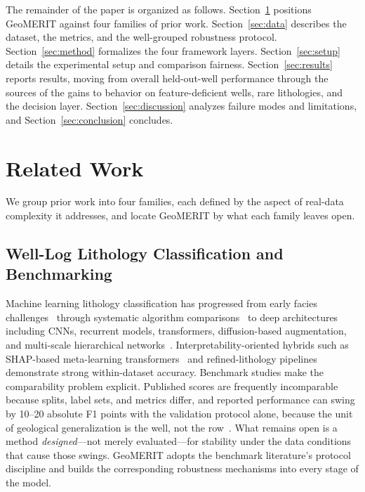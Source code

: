 \documentclass[bdcc,article,submit,pdftex,moreauthors]{Definitions/mdpi}
\begin{document}
The remainder of the paper is organized as follows. Section~\ref{sec:related} positions
GeoMERIT against four families of prior work. Section~\ref{sec:data} describes the dataset,
the metrics, and the well-grouped robustness protocol. Section~\ref{sec:method} formalizes
the four framework layers. Section~\ref{sec:setup} details the experimental setup and
comparison fairness. Section~\ref{sec:results} reports results, moving from overall
held-out-well performance through the sources of the gains to behavior on feature-deficient
wells, rare lithologies, and the decision layer. Section~\ref{sec:discussion} analyzes failure
modes and limitations, and
Section~\ref{sec:conclusion} concludes.

\section{Related Work}
\label{sec:related}
We group prior work into four families, each defined by the aspect of real-data complexity
it addresses, and locate GeoMERIT by what each family leaves open.

\subsection{Well-Log Lithology Classification and Benchmarking}
Machine learning lithology classification has progressed from early facies
challenges~\cite{hall2016facies} through systematic algorithm
comparisons~\cite{merembayev2021,dev2019formation} to deep architectures including CNNs,
recurrent models, transformers, diffusion-based augmentation, and multi-scale hierarchical
networks~\cite{wang2024dnnlitho,chen2025geological,zhao2025diffusion,zhan2025mchgeo}.
Interpretability-oriented hybrids such as SHAP-based meta-learning
transformers~\cite{sun2024shapmeta,lundberg2017shap} and refined-lithology
pipelines~\cite{shi2023refined} demonstrate strong within-dataset accuracy. Benchmark studies
make the comparability problem explicit. Published scores are frequently incomparable because
splits, label sets, and metrics differ, and reported performance can swing by 10--20 absolute
F1 points with the validation protocol alone, because the unit of geological generalization
is the well, not the row~\cite{carvalho2026benchmark,rosenblatt2024}. What remains open is a
method \emph{designed}---not merely evaluated---for stability under the data conditions that
cause those swings. GeoMERIT adopts the benchmark literature's protocol discipline and builds
the corresponding robustness mechanisms into every stage of the model.
\end{document}
